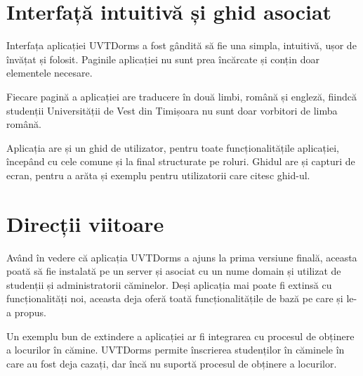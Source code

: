 \documentclass[12pt,a4paper]{report}
\theoremstyle{definition}
\theoremstyle{remark}
\begin{document}
\section{Interfață intuitivă și ghid asociat}

\par Interfața aplicației UVTDorms a fost gândită să fie una simpla, intuitivă, ușor de învățat și folosit. Paginile aplicației nu sunt prea încărcate și conțin doar elementele necesare.

\par Fiecare pagină a aplicației are traducere în două limbi, română și engleză, fiindcă studenții Universității de Vest din Timișoara nu sunt doar vorbitori de limba română.

\par Aplicația are și un ghid de utilizator, pentru toate funcționalitățile aplicației, începând cu cele comune și la final structurate pe roluri. Ghidul are și capturi de ecran, pentru a arăta și exemplu pentru utilizatorii care citesc ghid-ul.

\section{Direcții viitoare}

\par Având în vedere că aplicația UVTDorms a ajuns la prima versiune finală, aceasta poată să fie instalată pe un server și asociat cu un nume domain și utilizat de studenții și administratorii căminelor. Deși aplicația mai poate fi extinsă cu funcționalități noi, aceasta deja oferă toată funcționalitățile de bază pe care și le-a propus.

\par Un exemplu bun de extindere a aplicației ar fi integrarea cu procesul de obținere a locurilor în cămine. UVTDorms permite înscrierea studenților în căminele în care au fost deja cazați, dar încă nu suportă procesul de obținere a locurilor.



\end{document}
